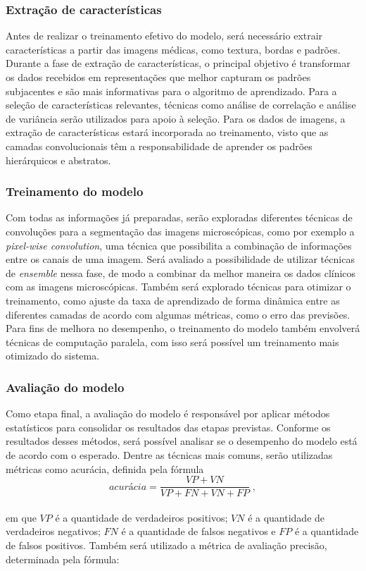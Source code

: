 \subsubsection{Extração de características}

Antes de realizar o treinamento efetivo do modelo, será necessário extrair características a partir das imagens médicas, como textura, bordas e padrões. Durante a fase de extração de características, o principal objetivo é transformar os dados recebidos em representações que melhor capturam os padrões subjacentes e são mais informativas para o algoritmo de aprendizado. Para a seleção de características relevantes, técnicas como análise de correlação e análise de variância serão utilizados para apoio à seleção. Para os dados de imagens, a extração de características estará incorporada ao treinamento, visto que as camadas convolucionais têm a responsabilidade de aprender os padrões hierárquicos e abstratos.

\subsubsection{Treinamento do modelo}

Com todas as informações já preparadas, serão exploradas diferentes técnicas de convoluções para a segmentação das imagens microscópicas, como por exemplo a \textit{pixel-wise convolution}, uma técnica que possibilita a combinação de informações entre os canais de uma imagem. Será avaliado a possibilidade de utilizar técnicas de \textit{ensemble} nessa fase, de modo a combinar da melhor maneira os dados clínicos com as imagens microscópicas. Também será explorado técnicas para otimizar o treinamento, como ajuste da taxa de aprendizado de forma dinâmica entre as diferentes camadas de acordo com algumas métricas, como o erro das previsões. Para fins de melhora no desempenho, o treinamento do modelo também envolverá técnicas de computação paralela, com isso será possível um treinamento mais otimizado do sistema.

\subsubsection{Avaliação do modelo}

Como etapa final, a avaliação do modelo é responsável por aplicar métodos estatísticos para consolidar os resultados das etapas previstas. Conforme os resultados desses métodos, será possível analisar se o desempenho do modelo está de acordo com o esperado. Dentre as técnicas mais comuns, serão utilizadas métricas como acurácia, definida pela fórmula 
\begin{equation}
  acurácia = \frac{VP +VN}{VP + FN + VN + FP} \; ,
    \label{eq: acuracia}
\end{equation}
\\
em que \(VP\) é a quantidade de verdadeiros positivos; \(VN\) é a quantidade de verdadeiros negativos; \(FN\) é a quantidade de falsos negativos e \(FP\) é a quantidade de falsos positivos. Também será utilizado a métrica de avaliação precisão, determinada pela fórmula:

